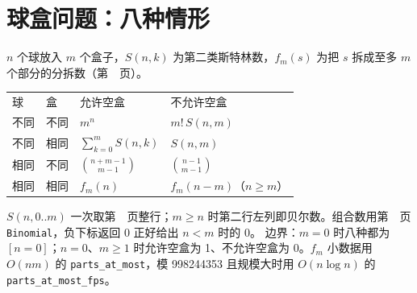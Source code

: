 \section{球盒问题：八种情形}\label{knowledge-ball-box}
$n$ 个球放入 $m$ 个盒子，$S(n,k)$ 为第二类斯特林数，$f_m(s)$ 为把 $s$ 拆成至多 $m$ 个部分的分拆数（第~\pageref{compact-parts_at_most}~页）。
\begin{center}
\begin{tabular}{llll}
球 & 盒 & 允许空盒 & 不允许空盒\\
不同 & 不同 & $m^n$ & $m!\,S(n,m)$\\
不同 & 相同 & $\sum_{k=0}^{m}S(n,k)$ & $S(n,m)$\\
相同 & 不同 & $\binom{n+m-1}{m-1}$ & $\binom{n-1}{m-1}$\\
相同 & 相同 & $f_m(n)$ & $f_m(n-m)$（$n\ge m$）\\
\end{tabular}
\end{center}
$S(n,0..m)$ 一次取第~\pageref{compact-stirling_second_row}~页整行；$m\ge n$ 时第二行左列即贝尔数。组合数用第~\pageref{compact-Binomial}~页 \texttt{Binomial}，负下标返回 0 正好给出 $n<m$ 时的 0。
边界：$m=0$ 时八种都为 $[n=0]$；$n=0$、$m\ge1$ 时允许空盒为 1、不允许空盒为 0。$f_m$ 小数据用 $O(nm)$ 的 \texttt{parts\_at\_most}，模 998244353 且规模大时用 $O(n\log n)$ 的 \texttt{parts\_at\_most\_fps}。
